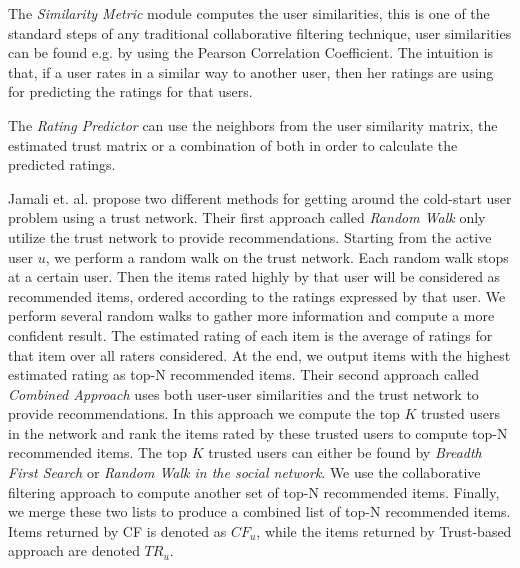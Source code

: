 The \emph{Similarity Metric} module computes the user similarities, this is one
of the standard steps of any traditional collaborative filtering technique,
user similarities can be found e.g. by using the Pearson Correlation
Coefficient. The intuition is that, if a user rates in a similar way to another
user, then her ratings are using for predicting the ratings for that users.

The \emph{Rating Predictor} can use the neighbors from the user similarity
matrix, the estimated trust matrix or a combination of both in order to
calculate the predicted ratings.



Jamali et. al. \cite{Jamali2009} propose two different methods for getting
around the cold-start user problem using a trust network. Their first approach called \emph{Random Walk} only utilize the trust network to provide recommendations. Starting from the active user $u$, we perform a random walk on the trust network. Each random walk stops at a certain user. Then the items rated highly by that user
will be considered as recommended items, ordered according to the ratings
expressed by that user. We perform several random walks to gather more
information and compute a more confident result. The estimated rating of each
item is the average of ratings for that item over all raters considered. At the
end, we output items with the highest estimated rating as top-N recommended
items. Their second approach called \emph{Combined Approach} uses both user-user similarities and the trust network to provide recommendations. In this approach we compute the top $K$ trusted users in the network and rank
the items rated by these trusted users to compute top-N recommended items. The top $K$ trusted users can either be found by
\emph{Breadth First Search} or \emph{Random Walk in the social network}. We use the collaborative filtering approach to compute another set of top-N
recommended items. Finally, we merge these two lists to produce a combined list of top-N recommended items. Items returned by CF is denoted as $CF_{u}$, while the items returned by Trust-based approach are denoted $TR_{u}$.




